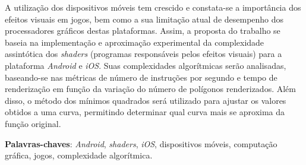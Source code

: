 \begin{resumo}

 A utilização dos dispositivos móveis tem crescido e constata-se a importância dos efeitos visuais em jogos, bem como a sua limitação atual de desempenho dos processadores gráficos destas plataformas. Assim, a proposta do trabalho se baseia na implementação e aproximação experimental da complexidade assintótica dos \textit{shaders} (programas responsáveis pelos efeitos visuais) para a plataforma \textit{Android} e \textit{iOS}. Suas complexidades algorítmicas serão analisadas, baseando-se nas métricas de número de instruções por segundo e tempo de renderização em função da variação do número de polígonos renderizados. Além disso, o método dos mínimos quadrados será utilizado para ajustar os valores obtidos a uma curva, permitindo determinar qual curva mais se aproxima da função original.

 \vspace{\onelineskip}
    
 \noindent
 \textbf{Palavras-chaves}: \textit{Android}, \textit{shaders}, \textit{iOS}, dispositivos móveis, computação gráfica, jogos, complexidade algorítmica. 
\end{resumo}
